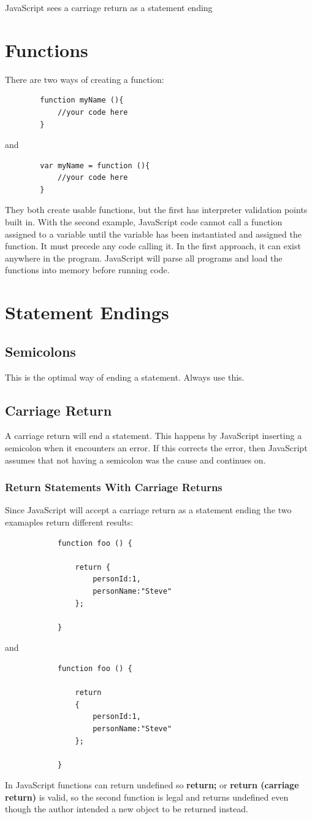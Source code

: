 \documentclass {article}
\begin{document}
		JavaScript sees a carriage return as a statement ending

\section {Functions}
	There are two ways of creating a function:

	\begin{lstlisting}
		function myName (){
			//your code here
		}
	\end{lstlisting}

	and 

	\begin{lstlisting}
		var myName = function (){
			//your code here
		}
	\end{lstlisting}

	They both create usable functions, but the first has interpreter validation points built in.  With the second example, JavaScript code cannot call a function assigned to a variable until the variable has been instantiated and assigned the function.  
It must precede any code calling it.  In the first approach, it can exist anywhere in the program.  JavaScript will parse all programs and load the functions into memory before running code.  


\section{Statement Endings}
	\subsection{Semicolons}
		This is the optimal way of ending a statement.  Always use this.
	\subsection {Carriage Return}
		A carriage return will end a statement.  This happens by JavaScript inserting a semicolon when it encounters an error.  If this corrects the error, then JavaScript assumes that not having a semicolon was the cause and continues on. 
	\subsubsection {Return Statements With Carriage Returns}
		Since JavaScript will accept a carriage return as a statement ending the two examaples return different results: 
		\begin{lstlisting}
			function foo () {

				return {
					personId:1,
					personName:"Steve"
				};

			}
		\end{lstlisting}
		and
		\begin{lstlisting}
			function foo () {

				return 
				{
					personId:1,
					personName:"Steve"
				};

			}
		\end{lstlisting}
	In JavaScript functions can return undefined so {\bf return;} or {\bf return (carriage return)} is valid, so the second function is legal and returns undefined even though the author intended a new object to be returned instead.
\end{document}
